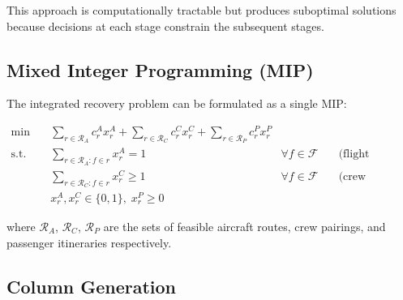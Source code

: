 \documentclass[11pt,a4paper]{book}
\theoremstyle{definition}
\begin{document}
This approach is computationally tractable but produces suboptimal solutions
because decisions at each stage constrain the subsequent stages.

\subsection{Mixed Integer Programming (MIP)}

The integrated recovery problem can be formulated as a single MIP:

\begin{align}
  \min \quad & \sum_{r \in \mathcal{R}_A} c_r^A x_r^A
              + \sum_{r \in \mathcal{R}_C} c_r^C x_r^C
              + \sum_{r \in \mathcal{R}_P} c_r^P x_r^P
              \label{eq:irops-mip} \\
  \text{s.t.} \quad
  & \sum_{r \in \mathcal{R}_A: f \in r} x_r^A = 1
    & \forall f \in \mathcal{F} \quad & \text{(flight coverage)} \\
  & \sum_{r \in \mathcal{R}_C: f \in r} x_r^C \geq 1
    & \forall f \in \mathcal{F} \quad & \text{(crew coverage)} \\
  & x_r^A, x_r^C \in \{0,1\},\; x_r^P \geq 0 & &
\end{align}

where $\mathcal{R}_A$, $\mathcal{R}_C$, $\mathcal{R}_P$ are the sets of
feasible aircraft routes, crew pairings, and passenger itineraries respectively.

\subsection{Column Generation}
\end{document}
